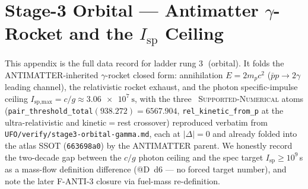 \section{Stage-3 Orbital --- Antimatter $\gamma$-Rocket and the $I_{\text{sp}}$ Ceiling}
\label{app:stage3}

This appendix is the full data record for ladder rung
\textcircled{\scriptsize 3} (orbital). It folds the
ANTIMATTER-inherited $\gamma$-rocket closed form: annihilation
$E=2m_pc^2$ ($\bar p p\!\to\!2\gamma$ leading channel), the relativistic
rocket exhaust, and the photon specific-impulse ceiling
$I_{\text{sp,max}}=c/g\approx\SI{3.06e7}{\second}$, with the three
\tierGreen\ \textsc{Supported-Numerical} atoms
(\verb|pair_threshold_total|$(938.272)=6567.904$,
\verb|rel_kinetic_from_p| at the ultra-relativistic and kinetic$=$rest
crossover) reproduced verbatim from
\texttt{UFO/verify/stage3-orbital-gamma.md}, each at $|\Delta|=0$ and
already folded into the atlas SSOT (\texttt{663698a0}) by the ANTIMATTER
parent. We honestly record the two-decade gap between the $c/g$ photon
ceiling and the spec target $I_{\text{sp}}\!\ge\!10^9$\,s as a mass-flow
definition difference (@D~d6 --- no forced target number), and note the
later F-ANTI-3 closure via fuel-mass re-definition.

